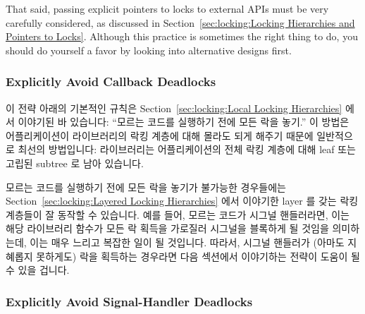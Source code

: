 That said, passing explicit pointers to locks to external APIs must
be very carefully considered, as discussed in
Section~\ref{sec:locking:Locking Hierarchies and Pointers to Locks}.
Although this practice is sometimes the right thing to do, you should do
yourself a favor by looking into alternative designs first.
\fi

\subsubsection{Explicitly Avoid Callback Deadlocks}
\label{sec:locking:Explicitly Avoid Callback Deadlocks}

이 전략 아래의 기본적인 규칙은
Section~\ref{sec:locking:Local Locking Hierarchies} 에서 이야기된 바 있습니다:
``모르는 코드를 실행하기 전에 모든 락을 놓기.''
이 방법은 어플리케이션이 라이브러리의 락킹 계층에 대해 몰라도 되게 해주기
때문에 일반적으로 최선의 방법입니다: 라이브러리는 어플리케이션의 전체 락킹
계층에 대해 leaf 또는 고립된 subtree 로 남아 있습니다.

모르는 코드를 실행하기 전에 모든 락을 놓기가 불가능한 경우들에는
Section~\ref{sec:locking:Layered Locking Hierarchies} 에서 이야기한 layer 를
갖는 락킹 계층들이 잘 동작할 수 있습니다.
예를 들어, 모르는 코드가 시그널 핸들러라면, 이는 해당 라이브러리 함수가 모든 락
획득을 가로질러 시그널을 블록하게 될 것임을 의미하는데, 이는 매우 느리고 복잡한
일이 될 것입니다.
따라서, 시그널 핸들러가 (아마도 지혜롭지 못하게도) 락을 획득하는 경우라면 다음
섹션에서 이야기하는 전략이 도움이 될 수 있을 겁니다.

\subsubsection{Explicitly Avoid Signal-Handler Deadlocks}
\label{sec:locking:Explicitly Avoid Signal-Handler Deadlocks}

